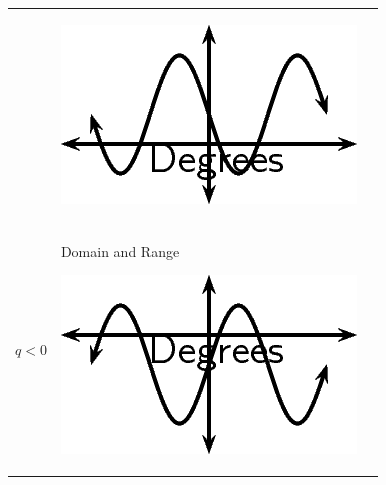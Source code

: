 \begin{center}
\begin{xtabular*}{\mytablewidth}[t]{|p{10\mystarwidth}|p{10\mystarwidth}|p{10\mystarwidth}|}
\begin{center}
\vspace{2pt}
\vspace{.1in}
\end{center}    
    &
\setcounter{subfigure}{0}
\label{m39414*id85384}
\begin{center}
\label{m39414*id85384!!!underscore!!!media}\label{m39414*id85384!!!underscore!!!printimage}\includegraphics{col11306.imgs/m39414_MG10C15_020.png} %
\vspace{2pt}
\vspace{.1in}
\end{center}    
\tabularnewline{}
    $q<0$
    &Domain and Range
\setcounter{subfigure}{0}
\label{m39414*id85421}
\begin{center}
\label{m39414*id85421!!!underscore!!!media}\label{m39414*id85421!!!underscore!!!printimage}\includegraphics{col11306.imgs/m39414_MG10C15_021.png} %
\vspace{2pt}

\end{center}
\end{xtabular*}
\end{center}
